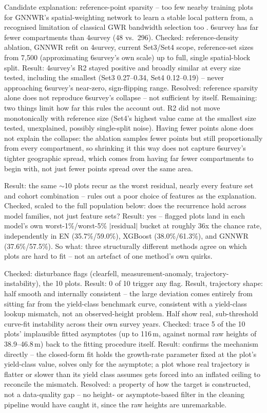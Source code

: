 \documentclass[logo,msc,ai]{infthesis}           %
\begin{document}
Candidate explanation: reference-point sparsity -- too few nearby training plots
for GNNWR's spatial-weighting network to learn a stable local pattern from, a
recognised limitation of classical GWR bandwidth selection too
\cite{brunsdon1996Geographically_C6_GWR}. 6survey has far fewer compartments than
4survey (48 vs.\ 296).
Checked: reference-density ablation, GNNWR refit on 4survey, current Set3/Set4
scope, reference-set sizes from 7,500 (approximating 6survey's own scale) up to
full, single spatial-block split.
Result: 4survey's R2 stayed positive and broadly similar at every size tested,
including the smallest (Set3 0.27--0.34, Set4 0.12--0.19) -- never approaching
6survey's near-zero, sign-flipping range.
Resolved: reference sparsity alone does not reproduce 6survey's collapse -- not
sufficient by itself.
Remaining: two things limit how far this rules the account out. R2 did not move
monotonically with reference size (Set4's highest value came at the smallest size
tested, unexplained, possibly single-split noise). Having fewer points alone does
not explain the collapse: the ablation samples fewer points but still
proportionally from every compartment, so shrinking it this way does not capture
6survey's tighter geographic spread, which comes from having far fewer
compartments to begin with, not just fewer points spread over the same area.

Result: the same $\sim$10 plots recur as the worst residual, nearly every feature
set and cohort combination -- rules out a poor choice of features as the
explanation.
Checked, scaled to the full population below: does the recurrence hold across
model families, not just feature sets? Result: yes -- flagged plots land in each
model's own worst-1\%/worst-5\% $|$residual$|$ bucket at roughly 36x the chance
rate, independently in EN (35.7\%/59.0\%), XGBoost (38.0\%/61.3\%), and GNNWR
(37.6\%/57.5\%).
So what: three structurally different methods agree on which plots are hard to
fit -- not an artefact of one method's own quirks.

Checked: disturbance flags (clearfell, measurement-anomaly, trajectory-instability),
the 10 plots. Result: 0 of 10 trigger any flag.
Result, trajectory shape: half smooth and internally consistent -- the large
deviation comes entirely from sitting far from the yield-class benchmark curve,
consistent with a yield-class lookup mismatch, not an observed-height problem.
Half show real, sub-threshold curve-fit instability across their own survey years.
Checked: trace 5 of the 10 plots' implausible fitted asymptotes (up to 116\,m,
against normal raw heights of 38.9--46.8\,m) back to the fitting procedure itself.
Result: confirms the mechanism directly -- the closed-form fit holds the
growth-rate parameter fixed at the plot's yield-class value, solves only for the
asymptote; a plot whose real trajectory is flatter or slower than its yield class
assumes gets forced into an inflated ceiling to reconcile the mismatch.
Resolved: a property of how the target is constructed, not a data-quality gap --
no height- or asymptote-based filter in the cleaning pipeline would have caught
it, since the raw heights are unremarkable.
\end{document}
